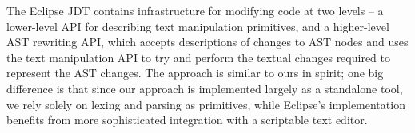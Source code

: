 The Eclipse JDT contains infrastructure for modifying code at two levels -- a
lower-level API for describing text manipulation primitives, and a higher-level
AST rewriting API, which accepts descriptions of changes to AST nodes and uses
the text manipulation API to try and perform the textual changes required to
represent the AST changes. The approach is similar to ours in spirit; one big
difference is that since our approach is implemented largely as a
standalone tool, we rely solely on lexing and parsing as primitives, while
Eclipse's implementation benefits from more sophisticated integration with a
scriptable text editor.
